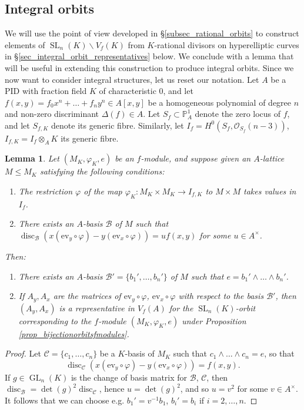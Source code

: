 \documentclass{article} %
\newtheorem{lemma}[proposition]{Lemma}
\numberwithin{equation}{section}
\DeclareMathOperator{\GL}{GL}
\DeclareMathOperator{\SL}{SL}
\newcommand{\bbP}{\mathbb{P}}
\newcommand{\cO}{\mathcal{O}}
\DeclareMathOperator{\disc}{disc}
\begin{document}
\subsection{Integral orbits}

We will use the point of view developed in \S\ref{subsec_rational_orbits} to construct elements of $\SL_n(K) \backslash V_f(K)$ from $K$-rational divisors on hyperelliptic curves in \S \ref{sec_integral_orbit_representatives} below. We conclude with a lemma that will be useful in extending this construction to produce integral orbits. Since we now want to consider integral structures, let us reset our notation. Let  $A$ be a PID with fraction field $K$ of characteristic 0, and let $f(x, y) = f_0 x^n + \dots + f_n y^n \in A[x, y]$ be a homogeneous polynomial of degree $n$ and non-zero discriminant $\Delta(f) \in A$. Let $S_f \subset \bbP^1_A$ denote the zero locus of $f$, and let $S_{f, K}$ denote its generic fibre. Similarly, let $I_f = H^0(S_f, \cO_{S_f}(n-3))$, $I_{f, K} = I_f \otimes_A K$ its generic fibre. 
\begin{lemma}\label{lem_application_of_integral_lattice}
    Let $(M_K, \varphi_K, e)$ be an $f$-module, and suppose given an $A$-lattice $M \leq M_K$ satisfying the following conditions:
    \begin{enumerate}
        \item The restriction $\varphi$ of the map $\varphi_K : M_K \times M_K \to I_{f, K}$ to $M \times M$ takes values in $I_f$.
        \item There exists an $A$-basis $\mathcal{B}$ of $M$ such that $\disc_\mathcal{B}( x (\mathrm{ev}_y \circ \varphi) - y (\mathrm{ev}_x \circ \varphi) ) = u f(x, y)$ for some $u \in A^\times$.  
    \end{enumerate}
    Then:
    \begin{enumerate}
        \item There exists an $A$-basis $\mathcal{B}' = \{ b_1', \dots, b_n' \}$ of $M$ such that $e = b_1' \wedge \dots \wedge b_n'$.
        \item If $A_y,A_x$ are the matrices of $\mathrm{ev}_y \circ \varphi$, $\mathrm{ev}_x \circ \varphi$ with respect to the basis $\mathcal{B}'$, then $(A_y,A_x)$ is a representative in $V_f(A)$ for the $\SL_n(K)$-orbit corresponding to the $f$-module $(M_K, \varphi_K, e)$ under Proposition \ref{prop_bijectionorbitsfmodules}.
    \end{enumerate}
\end{lemma}
\begin{proof}
    Let $\mathcal{C} = \{ c_1, \dots, c_n \}$ be a $K$-basis of $M_K$ such that $c_1 \wedge \dots \wedge c_n = e$, so that 
    \[ \disc_\mathcal{C}( x (\mathrm{ev}_y \circ \varphi) - y (\mathrm{ev}_x \circ \varphi) ) = f(x, y). \]
    If $g \in \GL_n(K)$ is the change of basis matrix for $\mathcal{B}$, $\mathcal{C}$, then $\disc_\mathcal{B} = \det(g)^2 \disc_\mathcal{C}$, hence $u = \det(g)^2$, and so $u = v^2$ for some $v \in A^\times$. It follows that we can choose e.g. $b_1' = v^{-1} b_1$, $b_i' = b_i$ if $i = 2, \dots, n$. 
\end{proof}
\end{document}
